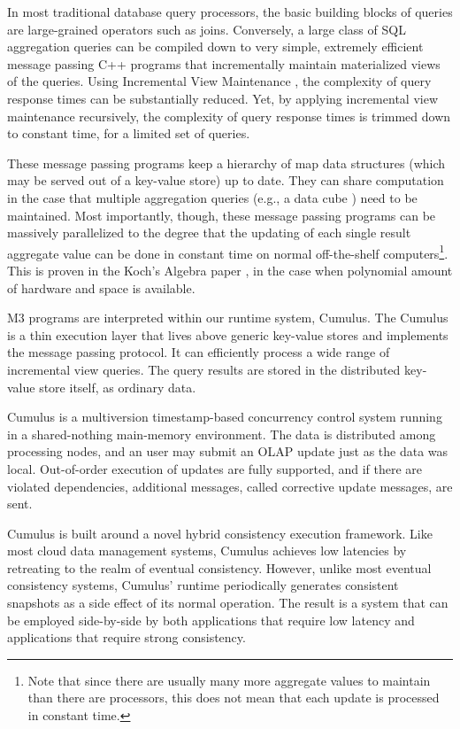 \documentclass{sig-semester}
\def\OLAP{OLAP\xspace}
\def\M3{M3\xspace}
\begin{document}
In most traditional database query processors, the basic building blocks of queries are large-grained operators such as joins. Conversely, a large class of SQL aggregation queries can be compiled down to very simple, extremely efficient message passing C++ programs that incrementally maintain materialized views of the queries. Using Incremental View Maintenance \cite{Lee01}, the complexity of query response times can be substantially reduced. Yet, by applying incremental view maintenance recursively, the complexity of query response times is trimmed down to constant time, for a limited set of queries.

These message passing programs keep a hierarchy of map data structures (which may be served out of a key-value store) up to date. They can share computation in the case that multiple aggregation queries (e.g., a data cube \cite{datacube}) need to be maintained.  Most importantly, though, these message passing programs can be massively parallelized to the degree that the updating of each single result aggregate value can be done in constant time on normal off-the-shelf computers\footnote{Note that since there are usually many more aggregate values to maintain than there are processors,
this does not mean that each update is processed in constant time.}. This is proven in the Koch's Algebra paper \cite{KochAlgebra10}, in the case when polynomial amount of hardware and space is available.

\M3 programs are interpreted within our runtime system, Cumulus. The Cumulus is a thin execution layer that lives above generic key-value stores and implements the message passing protocol. It can efficiently process a wide range of incremental view queries. The query results are stored in the distributed key-value store itself, as ordinary data.

Cumulus is a multiversion timestamp-based concurrency control system running in a shared-nothing main-memory environment. The data is distributed among processing nodes, and an user may submit an \OLAP update just as the data was local. Out-of-order execution of updates are fully supported, and if there are violated dependencies, additional messages, called corrective update messages, are sent.

Cumulus is built around a novel hybrid consistency execution framework. Like most cloud data management systems, Cumulus achieves low latencies by retreating to the realm of eventual consistency. However, unlike most eventual consistency systems, Cumulus' runtime periodically generates consistent snapshots as a side effect of its normal operation. The result is a system that can be employed side-by-side by both applications that require low latency and applications that require strong consistency.
\end{document}
